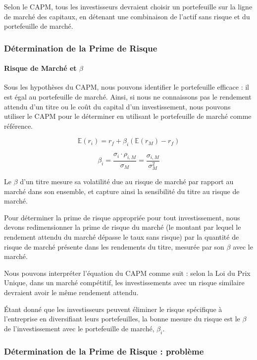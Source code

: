 \documentclass[a4paper, 12pt]{report}
\begin{document}
Selon le CAPM, tous les investisseurs devraient choisir un portefeuille sur la ligne de marché des capitaux, en détenant une combinaison de l'actif sans risque et du portefeuille de marché.

\subsubsection{Détermination de la Prime de Risque}

\paragraph{Risque de Marché et \( \beta \)}

Sous les hypothèses du CAPM, nous pouvons identifier le portefeuille efficace : il est égal au portefeuille de marché. Ainsi, si nous ne connaissons pas le rendement attendu d'un titre ou le coût du capital d'un investissement, nous pouvons utiliser le CAPM pour le déterminer en utilisant le portefeuille de marché comme référence.

\[
\mathbb{E}(r_i) = r_f + \beta_i (\mathbb{E}(r_M) - r_f) 
\]

\[
\beta_i = \frac{\sigma_i \cdot \rho_{i,M}}{\sigma_M} = \frac{\sigma_{i,M}}{\sigma^2_M} 
\]

Le \( \beta \) d'un titre mesure sa volatilité due au risque de marché par rapport au marché dans son ensemble, et capture ainsi la sensibilité du titre au risque de marché.

Pour déterminer la prime de risque appropriée pour tout investissement, nous devons redimensionner la prime de risque du marché (le montant par lequel le rendement attendu du marché dépasse le taux sans risque) par la quantité de risque de marché présente dans les rendements du titre, mesurée par son \( \beta \) avec le marché.


Nous pouvons interpréter l'équation du CAPM comme suit : selon la Loi du Prix Unique, dans un marché compétitif, les investissements avec un risque similaire devraient avoir le même rendement attendu.

Étant donné que les investisseurs peuvent éliminer le risque spécifique à l'entreprise en diversifiant leurs portefeuilles, la bonne mesure du risque est le \( \beta \) de l'investissement avec le portefeuille de marché, \( \beta_i \).

\subsubsection{Détermination de la Prime de Risque : problème}
\end{document}
